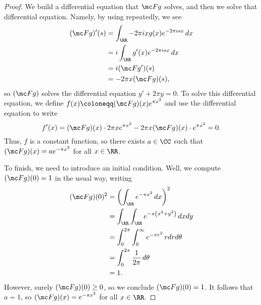 \documentclass[notes.tex]{subfiles}
\begin{document}
\begin{proof}
	We build a differential equation that $\mc Fg$ solves, and then we solve that differential equation. Namely, by using  repeatedly, we see
	\begin{align*}
		(\mc Fg)'(s) &= \int_\RR-2\pi ixg(x)e^{-2\pi isx}\,dx \\
		&= i\int_\RR g'(x)e^{-2\pi isx}\,dx \\
		&= i(\mc Fg')(s) \\
		&= -2\pi x(\mc Fg)(s),
	\end{align*}
	so $(\mc Fg)$ solves the differential equation $y'+2\pi y=0$. To solve this differential equation, we define $f(x)\coloneqq(\mc Fg)(x)e^{\pi x^2}$ and use the differential equation to write
	\[f'(x)=(\mc Fg)(x)\cdot2\pi xe^{\pi x^2}-2\pi x(\mc Fg)(x)\cdot e^{\pi x^2}=0.\]
	Thus, $f$ is a constant function, so there exists $a\in\CC$ such that $(\mc Fg)(x)=ae^{-\pi x^2}$ for all $x\in\RR$.

	To finish, we need to introduce an initial condition. Well, we compute $(\mc Fg)(0)=1$ in the usual way, writing
	\begin{align*}
		(\mc Fg)(0)^2 &= \left(\int_\RR e^{-\pi x^2}\,dx\right)^2 \\
		&= \int_\RR\int_\RR e^{-\pi\left(x^2+y^2\right)}\,dxdy \\
		&= \int_0^{2\pi}\int_0^\infty e^{-\pi r^2}\,rdrd\theta \\
		&= \int_0^{2\pi}\frac1{2\pi}\,d\theta \\
		&= 1.
	\end{align*}
	However, surely $(\mc Fg)(0)\ge0$, so we conclude $(\mc Fg)(0)=1$. It follows that $a=1$, so $(\mc Fg)(x)=e^{-\pi x^2}$ for all $x\in\RR$.
\end{proof}
\end{document}
